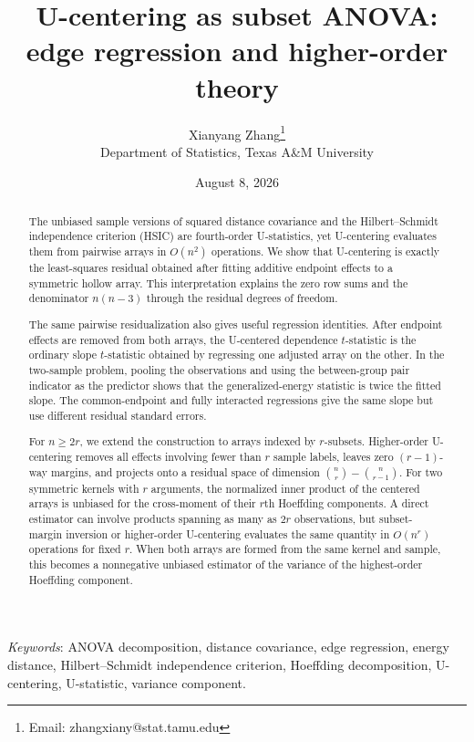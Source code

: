 \documentclass[11pt]{article}
\title{U-centering as subset ANOVA:\\ edge regression and higher-order theory}
\author{Xianyang Zhang\thanks{Email: zhangxiany@stat.tamu.edu}\\[2pt]
\normalsize Department of Statistics, Texas A\&M University}
\date{August 8, 2026}
\theoremstyle{plain}
\theoremstyle{definition}
\theoremstyle{remark}
\begin{document}
\maketitle


\begin{abstract}
The unbiased sample versions of squared distance covariance and the
Hilbert--Schmidt independence criterion (HSIC) are fourth-order U-statistics,
yet U-centering evaluates them from pairwise arrays in $O(n^2)$ operations.
We show that
U-centering is exactly the least-squares residual obtained after fitting
additive endpoint effects to a symmetric hollow array.  This interpretation
explains the zero row sums and the denominator $n(n-3)$ through the residual
degrees of freedom.

The same pairwise residualization also gives useful regression
identities.  After endpoint effects are removed from both arrays, the
U-centered dependence $t$-statistic is the ordinary slope $t$-statistic
obtained by regressing one adjusted array on the other.  In the two-sample
problem, pooling the observations
and using the between-group pair indicator as the predictor shows that
the generalized-energy statistic is twice the fitted slope.  The
common-endpoint and fully interacted regressions give the same slope but use
different residual standard errors.

For $n\ge2r$, we extend the construction to arrays indexed by $r$-subsets.
Higher-order U-centering removes all effects involving fewer than $r$ sample
labels, leaves zero $(r-1)$-way margins, and projects onto a residual space of
dimension $\binom nr-\binom n{r-1}$.  For two symmetric kernels with $r$
arguments, the normalized inner product of the centered arrays is unbiased
for the cross-moment of their $r$th Hoeffding components.  A direct estimator
can involve products spanning as many as $2r$ observations, but subset-margin
inversion or higher-order U-centering evaluates the same quantity in
$O(n^r)$ operations for fixed $r$.  When both arrays are formed from the same
kernel and sample, this becomes a nonnegative unbiased estimator of the
variance of the highest-order Hoeffding component.
\end{abstract}

\begin{center}
\small
\textit{Keywords}: ANOVA decomposition, distance covariance, edge regression,
energy distance, Hilbert--Schmidt independence criterion, Hoeffding
decomposition, U-centering, U-statistic, variance component.
\end{center}
\end{document}
